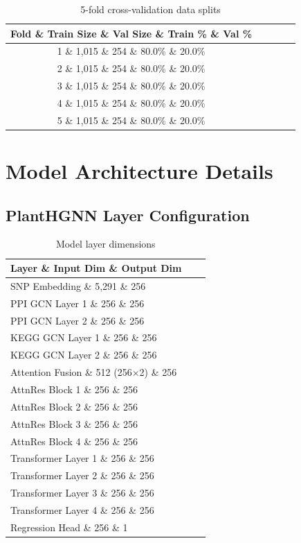 \documentclass[11pt,a4paper]{article}
\begin{document}
\begin{table}[H]
\centering
\caption{5-fold cross-validation data splits}
\label{tab:cv_splits}
\begin{tabular}{ccccc}
\toprule
\textbf{Fold} \& \textbf{Train Size} \& \textbf{Val Size} \& \textbf{Train \%} \& \textbf{Val \%} \\
\midrule
1 \& 1,015 \& 254 \& 80.0\% \& 20.0\% \\
2 \& 1,015 \& 254 \& 80.0\% \& 20.0\% \\
3 \& 1,015 \& 254 \& 80.0\% \& 20.0\% \\
4 \& 1,015 \& 254 \& 80.0\% \& 20.0\% \\
5 \& 1,015 \& 254 \& 80.0\% \& 20.0\% \\
\bottomrule
\end{tabular}
\end{table}

\section{Model Architecture Details}
\label{sec:model_details}

\subsection{PlantHGNN Layer Configuration}
\label{subsec:layer_config}

\begin{table}[H]
\centering
\caption{Model layer dimensions}
\label{tab:layer_dims}
\begin{tabular}{lcc}
\toprule
\textbf{Layer} \& \textbf{Input Dim} \& \textbf{Output Dim} \\
\midrule
SNP Embedding \& 5,291 \& 256 \\
PPI GCN Layer 1 \& 256 \& 256 \\
PPI GCN Layer 2 \& 256 \& 256 \\
KEGG GCN Layer 1 \& 256 \& 256 \\
KEGG GCN Layer 2 \& 256 \& 256 \\
Attention Fusion \& 512 (256×2) \& 256 \\
AttnRes Block 1 \& 256 \& 256 \\
AttnRes Block 2 \& 256 \& 256 \\
AttnRes Block 3 \& 256 \& 256 \\
AttnRes Block 4 \& 256 \& 256 \\
Transformer Layer 1 \& 256 \& 256 \\
Transformer Layer 2 \& 256 \& 256 \\
Transformer Layer 3 \& 256 \& 256 \\
Transformer Layer 4 \& 256 \& 256 \\
Regression Head \& 256 \& 1 \\
\bottomrule
\end{tabular}
\end{table}
\end{document}
